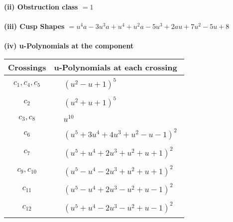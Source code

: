 \documentclass[1p]{elsarticle_modified}
\theoremstyle{definition}
\begin{document}
\flushleft \textbf{(ii) Obstruction class $= 1$}\\~\\
\flushleft \textbf{(iii) Cusp Shapes $= u^4 a-3 u^3 a+u^4+u^2 a-5 u^3+2 a u+7 u^2-5 u+8$}\\~\\
\newpage\renewcommand{\arraystretch}{1}
\flushleft \textbf{(iv) u-Polynomials at the component}\newline \\
\begin{tabular}{m{50pt}|m{274pt}}
Crossings & \hspace{64pt}u-Polynomials at each crossing \\
\hline $$\begin{aligned}c_{1},c_{4},c_{5}\end{aligned}$$&$\begin{aligned}
&(u^2- u+1)^5
\end{aligned}$\\
\hline $$\begin{aligned}c_{2}\end{aligned}$$&$\begin{aligned}
&(u^2+u+1)^5
\end{aligned}$\\
\hline $$\begin{aligned}c_{3},c_{8}\end{aligned}$$&$\begin{aligned}
&u^{10}
\end{aligned}$\\
\hline $$\begin{aligned}c_{6}\end{aligned}$$&$\begin{aligned}
&(u^5+3 u^4+4 u^3+u^2- u-1)^2
\end{aligned}$\\
\hline $$\begin{aligned}c_{7}\end{aligned}$$&$\begin{aligned}
&(u^5+u^4+2 u^3+u^2+u+1)^2
\end{aligned}$\\
\hline $$\begin{aligned}c_{9},c_{10}\end{aligned}$$&$\begin{aligned}
&(u^5- u^4-2 u^3+u^2+u+1)^2
\end{aligned}$\\
\hline $$\begin{aligned}c_{11}\end{aligned}$$&$\begin{aligned}
&(u^5- u^4+2 u^3- u^2+u-1)^2
\end{aligned}$\\
\hline $$\begin{aligned}c_{12}\end{aligned}$$&$\begin{aligned}
&(u^5+u^4-2 u^3- u^2+u-1)^2
\end{aligned}$\\
\hline
\end{tabular}\\~\\
\end{document}
